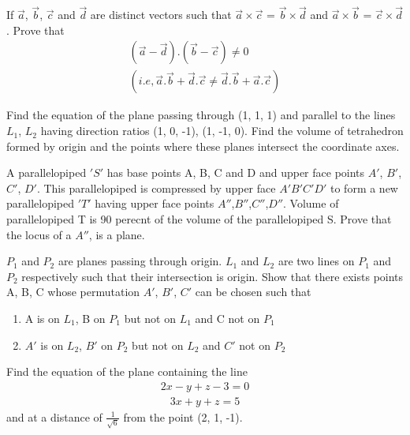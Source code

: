 \item If $\overrightarrow{a}$, $\overrightarrow{b}$, $\overrightarrow{c}$ and $\overrightarrow{d}$ are distinct vectors such that $\overrightarrow{a} \times \overrightarrow{c}$ = $\overrightarrow{b} \times 
\overrightarrow{d}$ and $\overrightarrow{a} \times \overrightarrow{b}$ = $\overrightarrow{c} \times 
\overrightarrow{d}$. Prove that
\begin{align*}
(\overrightarrow{a} - \overrightarrow{d}).(\overrightarrow{b} - \overrightarrow{c}) \neq 0 \\
(i.e, \overrightarrow{a}.\overrightarrow{b}+\overrightarrow{d}.\overrightarrow{c} \neq \overrightarrow{d}.\overrightarrow{b}+\overrightarrow{a}.\overrightarrow{c})
\end{align*}

\item Find the equation of the plane passing through (1, 1, 1) and parallel to the lines $L_1$, $L_2$ having direction ratios (1, 0, -1), (1, -1, 0). Find the volume of tetrahedron formed by origin and the points where these planes intersect the coordinate axes.

\item A parallelopiped $'S'$ has base points A, B, C and D and upper face points $A'$, $B'$, $C'$, $D'$. This parallelopiped is compressed by upper face $A'B'C'D'$ to form a new parallelopiped $'T'$ having upper face points $A''$,$B''$,$C''$,$D''$. Volume of parallelopiped T is 90 perecnt of the volume of the parallelopiped S. Prove that the locus of a $A''$, is a plane.

\item $P_1$ and $P_2$ are planes passing through origin. $L_1$ and $L_2$ are two lines on $P_1$ and $P_2$ respectively such that their intersection is origin. Show that there exists points A, B, C whose permutation $A'$, $B'$, $C'$ can be chosen such that
\begin{enumerate}
\item A is on $L_1$, B on $P_1$ but not on $L_1$ and C not on $P_1$
\item $A'$ is on $L_2$, $B'$ on $P_2$ but not on $L_2$ and $C'$ not on $P_2$
\end{enumerate} 

\item Find the equation of the plane containing the line
\begin{align*}
2x - y + z - 3 = 0
\end{align*}
\begin{align*}
3x + y + z = 5
\end{align*}
 and at a distance of $\frac{1}{\sqrt{6}}$ from the point (2, 1, -1).
 
